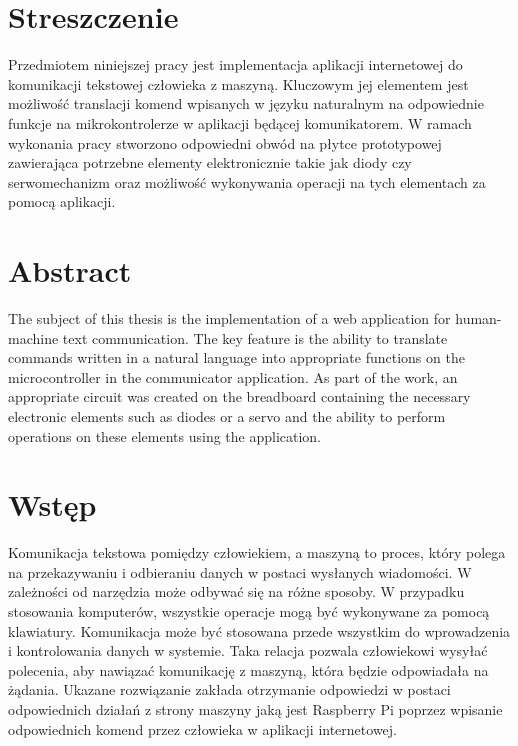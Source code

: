 \section{Streszczenie}
Przedmiotem niniejszej pracy jest implementacja aplikacji internetowej do komunikacji tekstowej człowieka z maszyną. Kluczowym jej elementem jest możliwość translacji komend wpisanych w języku naturalnym na odpowiednie funkcje na mikrokontrolerze w aplikacji będącej komunikatorem. W ramach wykonania pracy stworzono odpowiedni obwód na płytce prototypowej zawierająca potrzebne elementy elektronicznie takie jak diody czy serwomechanizm oraz możliwość wykonywania operacji na tych elementach za pomocą aplikacji.
\section{Abstract}
The subject of this thesis is the implementation of a web application for human-machine text communication. The key feature is the ability to translate commands written in a natural language into appropriate functions on the microcontroller in the communicator application. As part of the work, an appropriate circuit was created on the breadboard containing the necessary electronic elements such as diodes or a servo and the ability to perform operations on these elements using the application.
\section{Wstęp}
Komunikacja tekstowa pomiędzy człowiekiem, a maszyną to proces, który polega na przekazywaniu i odbieraniu danych w postaci wysłanych wiadomości. W zależności od narzędzia może odbywać się na różne sposoby. W przypadku stosowania komputerów, wszystkie operacje mogą być wykonywane za pomocą klawiatury. Komunikacja może być stosowana przede wszystkim do wprowadzenia i kontrolowania danych w systemie. Taka relacja pozwala człowiekowi wysyłać polecenia, aby nawiązać komunikację z maszyną, która będzie odpowiadała na żądania. Ukazane rozwiązanie zakłada otrzymanie odpowiedzi w postaci odpowiednich działań z strony maszyny jaką jest Raspberry Pi poprzez wpisanie odpowiednich komend przez człowieka w aplikacji internetowej.

